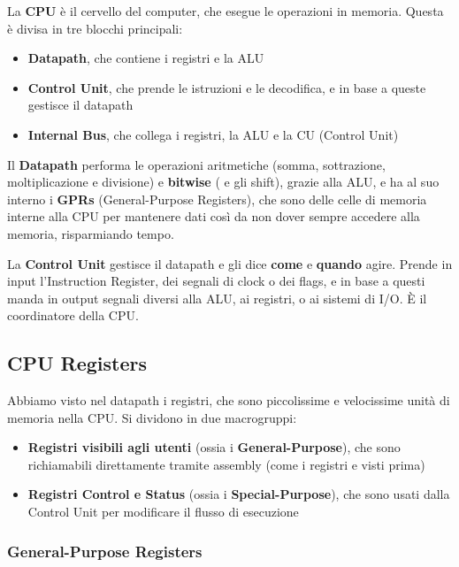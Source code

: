 \documentclass[11pt, a4paper, titlepage, oneside]{scrbook}
\begin{document}
\begin{Definizione}[CPU]
\label{def-CPU}
La \textbf{CPU} è il cervello del computer, che esegue le operazioni in memoria. Questa è divisa in tre blocchi principali:
\begin{itemize}
    \item \textbf{Datapath}, che contiene i registri e la ALU
    \item \textbf{Control Unit}, che prende le istruzioni e le decodifica, e in base a queste gestisce il datapath
    \item \textbf{Internal Bus}, che collega i registri, la ALU e la CU (Control Unit)
\end{itemize}
\end{Definizione}

Il \textbf{Datapath} performa le operazioni aritmetiche (somma, sottrazione, moltiplicazione e divisione) e \textbf{bitwise} ( e gli shift), grazie alla ALU, e ha al suo interno i \textbf{GPRs} (General-Purpose Registers), che sono delle celle di memoria interne alla CPU per mantenere dati così da non dover sempre accedere alla memoria, risparmiando tempo. 


La \textbf{Control Unit} gestisce il datapath e gli dice \textbf{come} e \textbf{quando} agire. Prende in input l'Instruction Register, dei segnali di clock o dei flags, e in base a questi manda in output segnali diversi alla ALU, ai registri, o ai sistemi di I/O. È il coordinatore della CPU.

\subsection{CPU Registers}

Abbiamo visto nel datapath i registri, che sono piccolissime e velocissime unità di memoria nella CPU. Si dividono in due macrogruppi:
\begin{itemize}
    \item \textbf{Registri visibili agli utenti} (ossia i \textbf{General-Purpose}), che sono richiamabili direttamente tramite assembly (come i registri  e  visti prima)
    \item \textbf{Registri Control e Status} (ossia i \textbf{Special-Purpose}), che sono usati dalla Control Unit per modificare il flusso di esecuzione
\end{itemize}

\subsubsection*{General-Purpose Registers}
\end{document}
